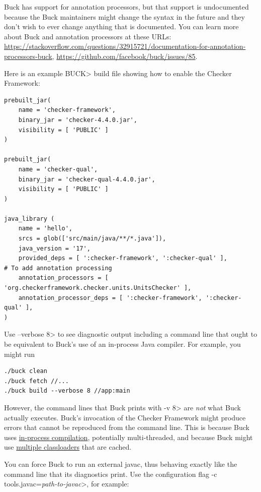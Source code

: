 Buck has support for annotation processors, but that support is
undocumented because the Buck maintainers might change the syntax in the
future and they don't wish to ever change anything that is documented.
You can learn more about Buck and annotation processors at these URLs:
{\codesize\url{https://stackoverflow.com/questions/32915721/documentation-for-annotation-processors-buck}},
{\codesize\url{https://github.com/facebook/buck/issues/85}}.

Here is an example \<BUCK> build
file showing how to enable the Checker Framework:

\begin{Verbatim}
prebuilt_jar(
    name = 'checker-framework',
    binary_jar = 'checker-4.4.0.jar',
    visibility = [ 'PUBLIC' ]
)

prebuilt_jar(
    name = 'checker-qual',
    binary_jar = 'checker-qual-4.4.0.jar',
    visibility = [ 'PUBLIC' ]
)

java_library (
    name = 'hello',
    srcs = glob(['src/main/java/**/*.java']),
    java_version = '17',
    provided_deps = [ ':checker-framework', ':checker-qual' ],
# To add annotation processing
    annotation_processors = [ 'org.checkerframework.checker.units.UnitsChecker' ],
    annotation_processor_deps = [ ':checker-framework', ':checker-qual' ],
)
\end{Verbatim}



Use \<--verbose 8> to see diagnostic output including a command line that
ought to be equivalent to Buck's use of an in-process Java compiler.
For example, you might run

\begin{Verbatim}
./buck clean
./buck fetch //...
./buck build --verbose 8 //app:main
\end{Verbatim}

However, the command lines that Buck prints with \<-v 8> are \emph{not} what
Buck actually executes.  Buck's invocation of the Checker Framework might
produce errors that cannot be reproduced from the command line.  This is
because Buck uses
\href{https://github.com/facebook/buck/blob/main/src/com/facebook/buck/jvm/java/Jsr199Javac.java}{in-process
  compilation}, potentially multi-threaded, and because Buck might use
\href{https://github.com/facebook/buck/blob/main/src/com/facebook/buck/util/ClassLoaderCache.java}{multiple
  classloaders} that are cached.

You can force Buck to run an external javac, thus behaving exactly like the
command line that its diagnostics print.  Use the configuration flag \<-c
tools.javac=\emph{path-to-javac}>, for example:

